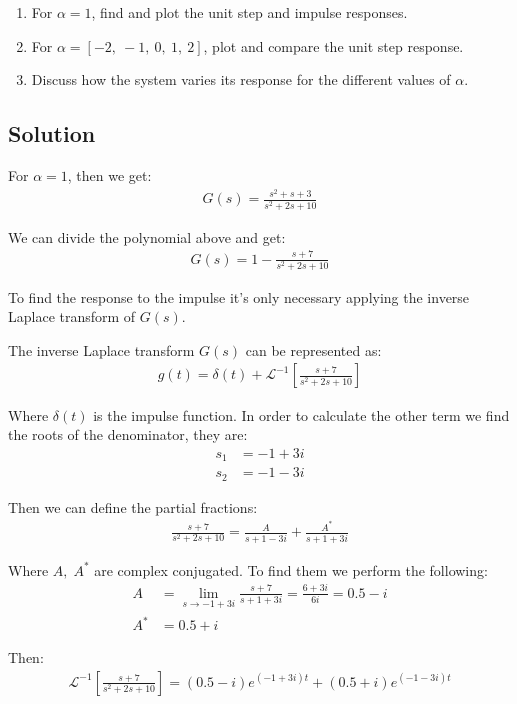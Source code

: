 \documentclass[a4paper,11pt]{article}
\begin{document}
\begin{enumerate}
\item For $\alpha=1$, find and plot the unit step and impulse responses.
\item For $\alpha=[-2, \ -1, \ 0, \ 1, \ 2]$, plot and compare the unit step response.
\item Discuss how the system varies its response for the different values of $\alpha$.
\end{enumerate}

\subsection*{Solution} 
For $\alpha =1$, then we get:
\begin{align*}
G(s) = \frac{s^2+s+3}{s^2+2s+10}
\end{align*}
\par We can divide the polynomial above and get:
\begin{align}
\label{eq:Eq14}
G(s) = 1-\frac{s+7}{s^2+2s+10}
\end{align}
\par To find the response to the impulse it's only necessary applying the inverse Laplace transform of $G(s)$.
\par The inverse Laplace transform $G(s)$ can be represented as:
\begin{align*}
g(t) = \delta (t)+ \mathcal{L}^{-1}\left[\frac{s+7}{s^2+2s+10}\right]
\end{align*}
\par Where $\delta (t)$ is the impulse function. In order to calculate the other term we find the roots of the denominator, they are:
\begin{align*}
s_1 &= -1+3i\\
s_2 &= -1-3i
\end{align*}
\par Then we can define the partial fractions:
\begin{align*}
\frac{s+7}{s^2+2s+10} = \frac{A}{s+1-3i}+\frac{A^*}{s+1+3i}
\end{align*}
\par Where $A,\; A^*$ are complex conjugated. To find them we perform the following:
\begin{align*}
A &=\lim_{s\rightarrow -1+3i} \frac{s+7}{s+1+3i}=\frac{6+3i}{6i}=0.5-i\\
A^*&=0.5+i
\end{align*}
\par Then:
\begin{align*}
\mathcal{L}^{-1}\left[\frac{s+7}{s^2+2s+10}\right]= (0.5-i)e^{(-1+3i)t}+(0.5+i)e^{(-1-3i)t}
\end{align*}
\end{document}
